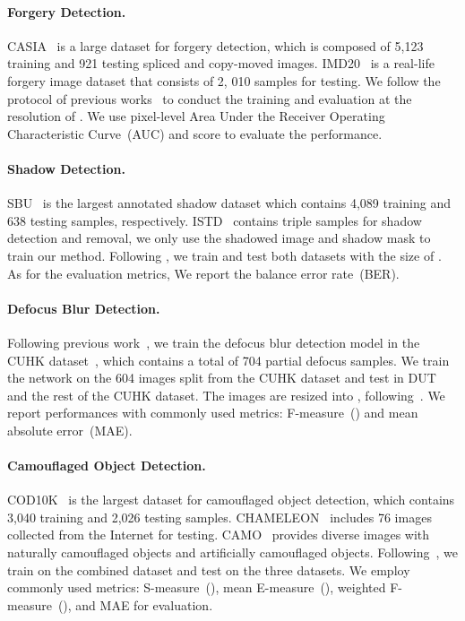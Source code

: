\paragraph{Forgery Detection.} CASIA~\cite{dong2013casia} is a large dataset for forgery detection, which is composed of 5,123 training and 921 testing spliced and copy-moved images. 
IMD20~\cite{novozamsky2020imd2020} is a real-life forgery image dataset that consists of 2, 010 samples for testing.
We follow the protocol of previous works~\cite{liu2022pscc, hao2021transforensics,wang2022objectformer} to conduct the training and evaluation at the resolution of . We use pixel-level Area Under the Receiver Operating Characteristic Curve~(AUC) and  score to evaluate the performance. 

\paragraph{Shadow Detection.} SBU~\cite{sbu} is the largest annotated shadow dataset which contains 4,089 training and 638 testing samples, respectively.
ISTD~\cite{wang2018stacked} contains triple samples for shadow detection and removal, we only use the shadowed image and shadow mask to train our method.
Following \cite{mtmt,zhu2018bidirectional,zhu2021mitigating}, we train and test both datasets with the size of . 
As for the evaluation metrics, We report the balance error rate~(BER).

\paragraph{Defocus Blur Detection.} 
Following previous work~\cite{zhao2018defocus, cun2020defocus}, we train the defocus blur detection model in the CUHK dataset~\cite{shi2014discriminative}, which contains a total of 704 partial defocus samples. We train the network on the 604 images split from the CUHK dataset and test in DUT~\cite{zhao2018defocus} and the rest of the CUHK dataset. 
The images are resized into , following~\cite{cun2020defocus}. We report performances with commonly used metrics: F-measure~() and mean absolute error~(MAE). 



\paragraph{Camouflaged Object Detection.} 
COD10K~\cite{fan2020camouflaged} is the largest dataset for camouflaged object detection, which contains 3,040 training and 2,026 testing samples. CHAMELEON~\cite{skurowski2018animal} includes 76 images collected from the Internet for testing. CAMO~\cite{le2019anabranch} provides diverse images with naturally camouflaged objects and artificially camouflaged objects. Following~\cite{fan2020camouflaged,mei2021camouflaged}, we train on the combined dataset and test on the three datasets. We employ commonly used metrics: S-measure~(), mean E-measure~(), weighted F-measure~(), and MAE for evaluation. 




